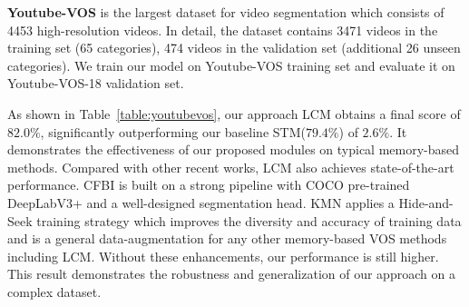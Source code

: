 \documentclass[final]{cvpr}
\begin{document}
\textbf{Youtube-VOS}\cite{youtubevos} is the largest dataset for video segmentation which consists of 4453 high-resolution videos. In detail, the dataset contains 3471 videos in the training set (65 categories), 474 videos in the validation set (additional 26 unseen categories). We train our model on Youtube-VOS training set and evaluate it on Youtube-VOS-18 validation set. 

As shown in Table~\ref{table:youtubevos}, our approach LCM obtains a final score of $82.0\%$, significantly outperforming our baseline STM($79.4\%$) of $2.6\%$. It demonstrates the effectiveness of our proposed modules on typical memory-based methods. Compared with other recent works, LCM also achieves state-of-the-art performance. CFBI\cite{cfbi} is built on a strong pipeline with COCO\cite{coco} pre-trained DeepLabV3+\cite{v3+} and a well-designed segmentation head. KMN applies a Hide-and-Seek training strategy which improves the diversity and accuracy of training data and is a general data-augmentation for any other memory-based VOS methods including LCM.  Without these enhancements, our performance is still higher. 
This result demonstrates the robustness and generalization of our approach on a complex dataset.
\end{document}
